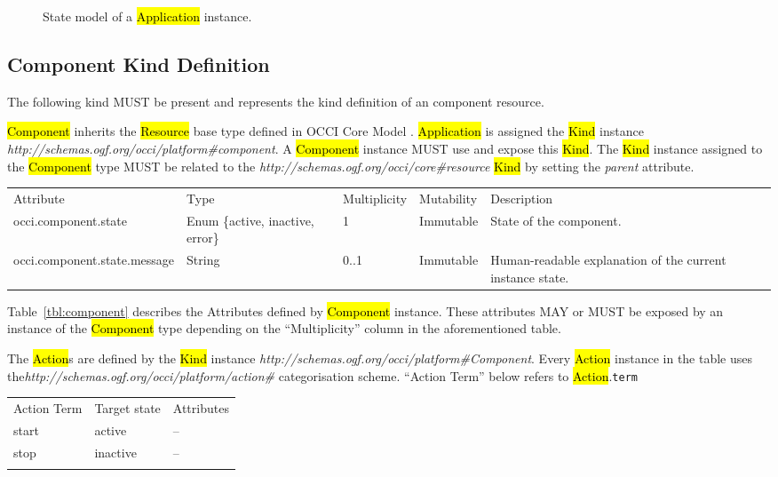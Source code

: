 \documentclass[10pt,a4paper]{article}
\begin{document}
\begin{figure}[!h]
	{\centering {} \par}
	\caption{State model of a \hl{Application} instance.}
	\label{fig:app_state}
\end{figure}

\subsection{Component Kind Definition}
The following kind MUST be present and represents the kind definition of an component resource.

\hl{Component} inherits the \hl{Resource} base type defined in OCCI Core Model \cite{occi:core}. \hl{Application} is assigned the \hl{Kind} instance \textit{http://schemas.ogf.org/occi/platform\#component}. A \hl{Component} instance MUST use and expose this \hl{Kind}. The \hl{Kind} instance assigned to the \hl{Component} type MUST be related to the \textit{http://schemas.ogf.org/occi/core\#resource} \hl{Kind} by setting the \textit{parent} attribute.

{
	\begin{tabular}{lp{2.5cm}p{1cm}lp{5cm}}
	\toprule
	Attribute&Type&Multi\-plicity&Mutability&Description\\
	\colrule
	occi.component.state & Enum \{active, inactive, error\} & 1 & Immutable & State of the component.\\
	occi.component.state.message & String & 0..1 & Immutable & Human-readable explanation of the current instance state.
	\botrule
	\end{tabular}
}

Table~\ref{tbl:component} describes the Attributes defined by \hl{Component} instance. These attributes MAY or MUST be exposed by an instance of the \hl{Component} type depending on the ``Multiplicity'' column in the aforementioned table.

The \hl{Action}s are defined by the \hl{Kind} instance \textit{http://schemas.ogf.org/occi/platform\#Component}. Every \hl{Action} instance in the table uses the\textit{http://schemas.ogf.org/occi/platform/action\#} categorisation scheme. ``Action Term'' below refers to \hl{Action}.{\tt term}

{
	\begin{tabular}{lll}
	\toprule
	Action Term & Target state & Attributes \\
	\colrule
	start & active & -- \\
	stop & inactive & -- \\
	\botrule
	\end{tabular}
}
\end{document}
